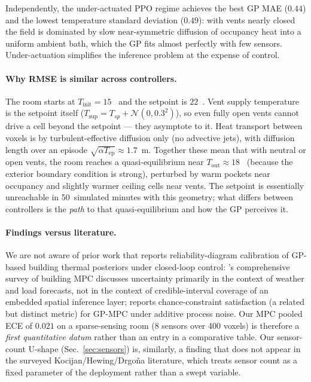 \documentclass[11pt,letterpaper]{article}
\begin{document}
Independently, the under-actuated PPO regime achieves the best GP MAE
($0.44$) and the lowest temperature standard deviation ($0.49$): with
vents nearly closed the field is dominated by slow near-symmetric
diffusion of occupancy heat into a uniform ambient bath, which the GP
fits almost perfectly with few sensors. Under-actuation simplifies the
inference problem at the expense of control.

\paragraph{Why RMSE is similar across controllers.}
The room starts at $T_{\mathrm{init}}=15$~\textcelsius{} and the
setpoint is $22$~\textcelsius. Vent supply temperature is the setpoint
itself ($T_{\mathrm{sup}} = T_{sp} + \mathcal{N}(0, 0.3^2)$), so even
fully open vents cannot drive a cell beyond the setpoint --- they
asymptote to it. Heat transport between voxels is by turbulent-effective
diffusion only (no advective jets), with diffusion length over an
episode $\sqrt{\alpha T_\mathrm{ep}} \approx 1.7$~m. Together these mean
that with neutral or open vents, the room reaches a quasi-equilibrium
near $T_\mathrm{out} \approx 18$~\textcelsius{} (because the exterior
boundary condition is strong), perturbed by warm pockets near occupancy
and slightly warmer ceiling cells near vents. The setpoint is essentially
unreachable in 50~simulated minutes with this geometry; what differs
between controllers is the \emph{path} to that quasi-equilibrium and
how the GP perceives it.

\paragraph{Findings versus literature.}
We are not aware of prior work that reports reliability-diagram
calibration of GP-based building thermal posteriors under closed-loop
control: \citet{drgona2020}'s comprehensive survey of building MPC
discusses uncertainty primarily in the context of weather and load
forecasts, not in the context of credible-interval coverage of an
embedded spatial inference layer; \citet{hewing2020} reports
chance-constraint satisfaction (a related but distinct metric) for
GP-MPC under additive process noise. Our MPC pooled ECE of $0.021$ on
a sparse-sensing room (8 sensors over 400 voxels) is therefore a
\emph{first quantitative datum} rather than an entry in a comparative
table. Our sensor-count U-shape (Sec.~\ref{sec:sensors}) is, similarly,
a finding that does not appear in the surveyed Kocijan/Hewing/Drgo\v{n}a
literature, which treats sensor count as a fixed parameter of the
deployment rather than a swept variable.
\end{document}
